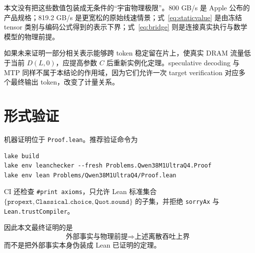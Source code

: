 \documentclass[11pt,a4paper]{ctexart}
\begin{document}
本文没有把这些数值包装成无条件的“宇宙物理极限”。800 GB/s 是 Apple 公布的产品规格；819.2 GB/s 是更宽松的原始线速情景；式~\eqref{eq:staticvalue} 是由冻结 tensor 类别与编码公式得到的表示下界；式~\eqref{eq:bridge} 则是连接真实执行与数学模型的物理前提。

如果未来证明一部分相关表示能够跨 token 稳定留在片上，使真实 DRAM 流量低于当前 $D(L,0)$，应提高参数 $C$ 后重新实例化定理。speculative decoding 与 MTP 同样不属于本结论的作用域，因为它们允许一次 target verification 对应多个最终输出 token，改变了计量关系。

\section{形式验证}

机器证明位于 \texttt{Proof.lean}。推荐验证命令为
\begin{verbatim}
lake build
lake env leanchecker --fresh Problems.Qwen38M1UltraQ4.Proof
lake env lean Problems/Qwen38M1UltraQ4/Proof.lean
\end{verbatim}
CI 还检查 \texttt{\#print axioms}，只允许 Lean 标准集合 $\{\texttt{propext},\texttt{Classical.choice},\texttt{Quot.sound}\}$ 的子集，并拒绝 \texttt{sorryAx} 与 \texttt{Lean.trustCompiler}。

因此本文最终证明的是
\[
\boxed{
\text{外部事实与物理前提}
\Longrightarrow
\text{上述离散吞吐上界}}
\]
而不是把外部事实本身伪装成 Lean 已证明的定理。
\end{document}

